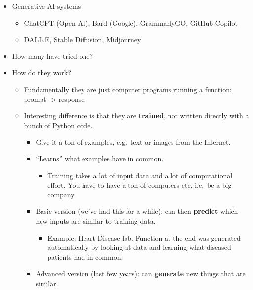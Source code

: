 \documentclass{article}
\begin{document}
\begin{itemize}
  \item Generative AI systems
\begin{itemize}
  \item
    ChatGPT (Open AI), Bard (Google), GrammarlyGO, GitHub Copilot
  \item
    DALL.E, Stable Diffusion, Midjourney
  \end{itemize}
\item
  How many have tried one?
\item
  How do they work?

  \begin{itemize}

  \item
    Fundamentally they are just computer programs running a function:
    prompt -\textgreater{} response.
  \item
    Interesting difference is that they are \textbf{trained}, not
    written directly with a bunch of Python code.

    \begin{itemize}

    \item
      Give it a ton of examples, e.g.~text or images from the Internet.
    \item
      ``Learns'' what examples have in common.

      \begin{itemize}

      \item
        Training takes a lot of input data and a lot of computational
        effort. You have to have a ton of computers etc, i.e.~be a big
        company.
      \end{itemize}
    \item
      Basic version (we've had this for a while): can then
      \textbf{predict} which new inputs are similar to training data.

      \begin{itemize}

      \item
        Example: Heart Disease lab. Function at the end was generated
        automatically by looking at data and learning what diseased
        patients had in common.
      \end{itemize}
    \item
      Advanced version (last few years): can \textbf{generate} new
      things that are similar.


\end{itemize}
\end{itemize}
\end{itemize}
\end{document}
